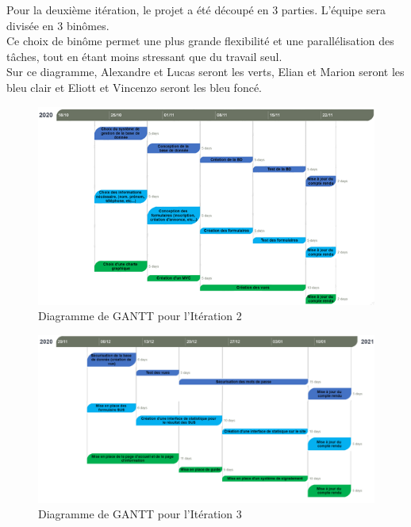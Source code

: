 \documentclass[a4paper,11pt]{article}
\begin{document}
Pour la deuxième itération, le projet a été découpé en 3 parties. L’équipe sera divisée en 3 binômes.\\

Ce choix de binôme permet une plus grande flexibilité et une parallélisation des tâches, tout en étant
moins stressant que du travail seul.\\

Sur ce diagramme, Alexandre et Lucas seront les verts,
Elian et Marion seront les bleu clair et
Eliott et Vincenzo seront les bleu foncé.\\

\begin{figure}[H]
  \includegraphics[width=\linewidth]{images/gantt-iteration2.png}
  \caption{Diagramme de GANTT pour l'Itération 2}
  \label{fig:gantt-iteration2}
\end{figure}

\begin{figure}[H]
  \includegraphics[width=\linewidth]{images/gantt-iteration3.png}
  \caption{Diagramme de GANTT pour l'Itération 3}
  \label{fig:gantt-iteration3}
\end{figure}
\end{document}
